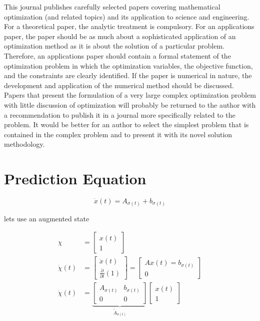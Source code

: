 \documentclass[smallextended,referee,envcountsect,]{svjour3}
\begin{document}
This journal publishes carefully selected papers covering mathematical optimization (and related topics) and its application to science and engineering. For a theoretical paper, the analytic treatment is compulsory. For an applications paper, the paper should be as much about a sophisticated application of an optimization method as it is about the solution of a particular problem. Therefore, an applications paper should contain a formal statement of the optimization problem in which the optimization variables, the objective function, and the constraints are clearly identified. If the paper is numerical in nature, the development and application of the numerical method should be discussed. Papers that present the formulation of a very large complex optimization problem with little discussion of optimization will probably be returned to the author with a recommendation to publish it in a journal more specifically related to the problem. It would be better for an author to select the simplest problem that is contained in the complex problem and to present it with its novel solution methodology.

\section{Prediction Equation}

\begin{equation}
   \dot{x}(t) = A_{\sigma(t)} + b_{\sigma(t)}
\end{equation}

lets use an augmented state 

\begin{align}
   \chi 
      &= \left[ \begin{matrix} x(t) \\ 1 \end{matrix} \right]
      \\
   \dot{\chi}(t) 
      &= \left[ \begin{matrix} \dot{x}(t) \\ \frac{\partial}{\partial t}(1) \end{matrix} \right] 
      = \left[ \begin{matrix} A x(t) = b_{\sigma(t)} \\ 0 \end{matrix} \right] 
      \\
   \dot{\chi}(t) 
      &= \underbrace{ \left[ \begin{matrix} A_{\sigma(t)} & b_{\sigma(t)} \\ 0 & 0 \end{matrix} \right] }_{\tilde{A}_{\sigma(t)}} \left[ \begin{matrix} x(t) \\ 1 \end{matrix} \right]
\end{align}
\end{document}
